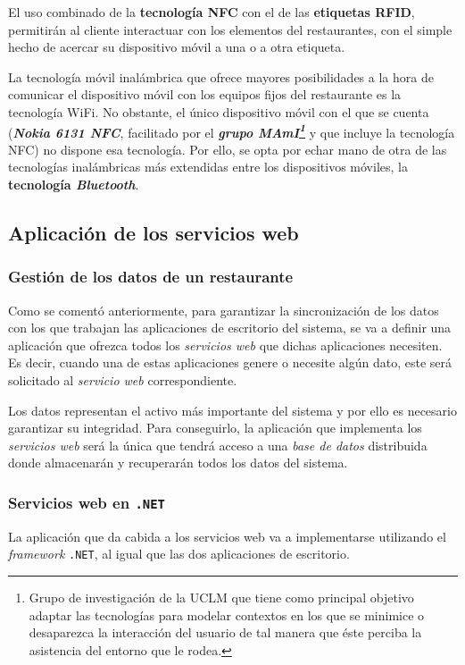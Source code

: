   El uso combinado de la \textbf{tecnología \acs{NFC}} con el de las
  \textbf{etiquetas \acs{RFID}}, permitirán al cliente interactuar con los
  elementos del restaurantes, con el simple hecho de acercar su dispositivo
  móvil a una o a otra etiqueta.

  La tecnología móvil inalámbrica que ofrece mayores posibilidades a la hora
  de comunicar el dispositivo móvil con los equipos fijos del restaurante es
  la tecnología \acs{WiFi}. No obstante, el único dispositivo móvil con el que
  se cuenta (\emph{\textbf{Nokia 6131 \acs{NFC}}}, facilitado por el
  \textbf{\emph{grupo \acs{MAmI}\footnote{Grupo de investigación de la
  \acs{UCLM} que tiene como principal objetivo adaptar las tecnologías para 
  modelar contextos en los que se minimice o desaparezca la interacción del 
  usuario de tal manera que éste perciba la asistencia del entorno que le 
  rodea.}}} y que incluye la tecnología \acs{NFC}) no
  dispone esa tecnología. Por ello, se opta por echar mano de otra de las
  tecnologías inalámbricas más extendidas entre los dispositivos móviles, la
  \textbf{tecnología \emph{Bluetooth}}.

  \subsection{Aplicación de los servicios web}
    \subsubsection{Gestión de los datos de un restaurante}
  Como se comentó anteriormente, para garantizar la sincronización de los
datos con los que trabajan las aplicaciones de escritorio del sistema, se va a
definir una aplicación que ofrezca todos los \emph{servicios web} que dichas
aplicaciones necesiten. Es decir, cuando una de estas aplicaciones genere o
necesite algún dato, este será solicitado al \emph{servicio web}
correspondiente.

  Los datos representan el activo más importante del sistema y por ello es
necesario garantizar su integridad. Para conseguirlo, la aplicación que
implementa los \emph{servicios web} será la única que tendrá acceso a una
\emph{base de datos} distribuida donde almacenarán y recuperarán todos los
datos del sistema.

    \subsubsection{Servicios web en \texttt{.NET}}
La aplicación que da cabida a los servicios web va a implementarse utilizando
el \emph{framework} \texttt{.NET}, al igual que las dos aplicaciones de
escritorio.

